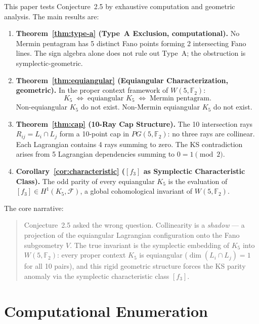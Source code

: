 \documentclass[11pt,a4paper]{article}
\theoremstyle{remark}
\newcommand{\F}{\mathbb{F}}
\newcommand{\cF}{\mathcal{F}}
\begin{document}
This paper tests Conjecture~2.5 by exhaustive computation and
geometric analysis. The main results are:

\begin{enumerate}
  \item \textbf{Theorem~\ref{thm:type-a} (Type~A Exclusion, computational).}
    No Mermin pentagram has 5 distinct Fano points forming 2 intersecting
    Fano lines. The sign algebra alone does not rule out Type~A; the
    obstruction is symplectic-geometric.

  \item \textbf{Theorem~\ref{thm:equiangular} (Equiangular Characterization, geometric).}
    In the proper context framework of $W(5, \F_2)$:
    \[
    K_5 \;\Longleftrightarrow\; \text{equiangular } K_5
    \;\Longleftrightarrow\; \text{Mermin pentagram}.
    \]
    Non-equiangular $K_5$ do not exist. Non-Mermin equiangular $K_5$
    do not exist.

  \item \textbf{Theorem~\ref{thm:cap} (10-Ray Cap Structure).}
    The 10 intersection rays $R_{ij} = L_i \cap L_j$ form a 10-point
    cap in $PG(5, \F_2)$: no three rays are collinear. Each Lagrangian
    contains 4 rays summing to zero. The KS contradiction arises from
    5 Lagrangian dependencies summing to $0 = 1 \pmod{2}$.

  \item \textbf{Corollary~\ref{cor:characteristic} ($[f_3]$ as Symplectic
    Characteristic Class).} The odd parity of every equiangular $K_5$
    is the evaluation of $[f_3] \in H^1(K_5, \cF)$, a global
    cohomological invariant of $W(5, \F_2)$.
\end{enumerate}

The core narrative:

\begin{quote}
  Conjecture~2.5 asked the wrong question. Collinearity is a
  \emph{shadow} --- a projection of the equiangular Lagrangian
  configuration onto the Fano subgeometry $V$. The true invariant is
  the symplectic embedding of $K_5$ into $W(5, \F_2)$: every proper
  context $K_5$ is equiangular ($\dim(L_i \cap L_j) = 1$ for all
  10 pairs), and this rigid geometric structure forces the KS parity
  anomaly via the symplectic characteristic class $[f_3]$.
\end{quote}

\section{Computational Enumeration}
\label{sec:enumeration}
\end{document}
